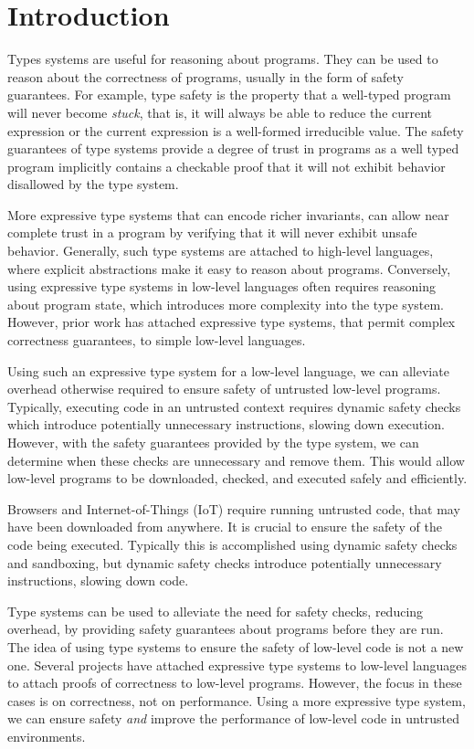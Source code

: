 \chapter{Introduction}
\label{chp:intro}

Types systems are useful for reasoning about programs.
They can be used to reason about the correctness of programs, usually in the form of safety guarantees.
For example, type safety is the property that a well-typed program will never become \emph{stuck}, that is, it will always be able to reduce the current expression or the current expression is a well-formed irreducible value.
The safety guarantees of type systems provide a degree of trust in programs as a well typed program implicitly contains a checkable proof that it will not exhibit behavior disallowed by the type system.

More expressive type systems that can encode richer invariants, can allow near complete trust in a program by verifying that it will never exhibit unsafe behavior.
Generally, such type systems are attached to high-level languages, where explicit abstractions make it easy to reason about programs.
Conversely, using expressive type systems in low-level languages often requires reasoning about program state, which introduces more complexity into the type system.
However, prior work has attached expressive type systems, that permit complex correctness guarantees, to simple low-level languages.

Using such an expressive type system for a low-level language, we can alleviate overhead otherwise required to ensure safety of untrusted low-level programs.
Typically, executing code in an untrusted context requires dynamic safety checks which introduce potentially unnecessary instructions, slowing down execution.
However, with the safety guarantees provided by the type system, we can determine when these checks are unnecessary and remove them.
This would allow low-level programs to be downloaded, checked, and executed safely and efficiently.

Browsers and Internet-of-Things (IoT) require running untrusted code, that may have been downloaded from anywhere.
It is crucial to ensure the safety of the code being executed.
Typically this is accomplished using dynamic safety checks and sandboxing, but dynamic safety checks introduce potentially unnecessary instructions, slowing down code.

Type systems can be used to alleviate the need for safety checks, reducing overhead, by providing safety guarantees about programs before they are run.
The idea of using type systems to ensure the safety of low-level code is not a new one.
Several projects have attached expressive type systems to low-level languages to attach proofs of correctness to low-level programs.
However, the focus in these cases is on correctness, not on performance.
Using a more expressive type system, we can ensure safety \emph{and} improve the performance of low-level code in untrusted environments.

